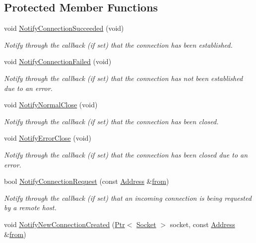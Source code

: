 \subsection*{Protected Member Functions}
\begin{DoxyCompactItemize}
\item 
void \hyperlink{classns3_1_1Socket_a2f55d195304131b356818bc74134c5a7}{Notify\+Connection\+Succeeded} (void)
\begin{DoxyCompactList}\small\item\em Notify through the callback (if set) that the connection has been established. \end{DoxyCompactList}\item 
void \hyperlink{classns3_1_1Socket_a34f83cdc8fb487ac8ea5436d184827c4}{Notify\+Connection\+Failed} (void)
\begin{DoxyCompactList}\small\item\em Notify through the callback (if set) that the connection has not been established due to an error. \end{DoxyCompactList}\item 
void \hyperlink{classns3_1_1Socket_a6bdec380c7dacff36147b89a05ceae84}{Notify\+Normal\+Close} (void)
\begin{DoxyCompactList}\small\item\em Notify through the callback (if set) that the connection has been closed. \end{DoxyCompactList}\item 
void \hyperlink{classns3_1_1Socket_a9b89cb8b7718d3a0641ce812970f9c16}{Notify\+Error\+Close} (void)
\begin{DoxyCompactList}\small\item\em Notify through the callback (if set) that the connection has been closed due to an error. \end{DoxyCompactList}\item 
bool \hyperlink{classns3_1_1Socket_a41c2de15bac8a50d6d54067937f77d28}{Notify\+Connection\+Request} (const \hyperlink{classns3_1_1Address}{Address} \&\hyperlink{lte__amc_8m_a1b4c81ff74eb1a626b5ade44c81004b3}{from})
\begin{DoxyCompactList}\small\item\em Notify through the callback (if set) that an incoming connection is being requested by a remote host. \end{DoxyCompactList}\item 
void \hyperlink{classns3_1_1Socket_a38c6f13f6c475afa2eadc1cf1a54a0e7}{Notify\+New\+Connection\+Created} (\hyperlink{classns3_1_1Ptr}{Ptr}$<$ \hyperlink{classns3_1_1Socket}{Socket} $>$ socket, const \hyperlink{classns3_1_1Address}{Address} \&\hyperlink{lte__amc_8m_a1b4c81ff74eb1a626b5ade44c81004b3}{from})

\end{DoxyCompactItemize}
